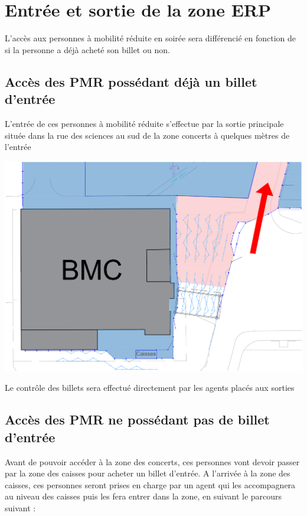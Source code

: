 \documentclass[hidelinks, paper=a4, fontsize=13pt]{report}
\begin{document}
\section{Entrée et sortie de la zone ERP}
L’accès aux personnes à mobilité réduite en soirée sera différencié en fonction de si la personne a déjà acheté son billet ou non.

\subsection{Accès des PMR possédant déjà un billet d’entrée}


L’entrée de ces personnes à mobilité réduite s’effectue par la sortie principale située dans la rue des sciences au sud de la zone concerts à quelques mètres de l’entrée


\begin{center}
\includegraphics[width=.8\textwidth,keepaspectratio]{Exports/Plan_24h_44eme-Acces_PMR_ac_Billet}
\end{center}


Le contrôle des billets sera effectué directement par les agents placés aux sorties


\subsection{Accès des PMR ne possédant pas de billet d’entrée}

Avant de pouvoir accéder à la zone des concerts, ces personnes vont devoir passer par la zone des caisses pour acheter un billet d’entrée. A l’arrivée à la zone des caisses, ces personnes seront prises en charge par un agent qui les accompagnera au niveau des caisses puis les fera entrer dans la zone, en suivant le parcours suivant :
\end{document}
